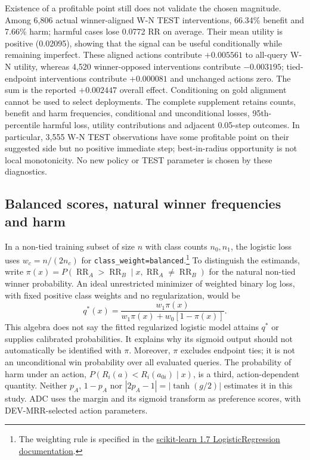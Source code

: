 \documentclass[11pt,a4paper]{article}
\newcommand{\RR}{\operatorname{RR}}
\begin{document}


Existence of a profitable point still does not validate the chosen magnitude. Among 6,806 actual winner-aligned W-N TEST interventions, 66.34\% benefit and 7.66\% harm; harmful cases lose 0.0772 RR on average. Their mean utility is positive (0.02095), showing that the signal can be useful conditionally while remaining imperfect. These aligned actions contribute $+0.005561$ to all-query W-N utility, whereas 4,520 winner-opposed interventions contribute $-0.003195$; tied-endpoint interventions contribute $+0.000081$ and unchanged actions zero. The sum is the reported $+0.002447$ overall effect. Conditioning on gold alignment cannot be used to select deployments. The complete supplement retains counts, benefit and harm frequencies, conditional and unconditional losses, 95th-percentile harmful loss, utility contributions and adjacent 0.05-step outcomes. In particular, 3,555 W-N TEST observations have some profitable point on their suggested side but no positive immediate step; best-in-radius opportunity is not local monotonicity. No new policy or TEST parameter is chosen by these diagnostics.

\subsection{Balanced scores, natural winner frequencies and harm}
In a non-tied training subset of size $n$ with class counts $n_0,n_1$, the logistic loss uses $w_c=n/(2n_c)$ for \texttt{class\_weight=balanced}.\footnote{The weighting rule is specified in the \href{https://scikit-learn.org/1.7/modules/generated/sklearn.linear_model.LogisticRegression.html}{scikit-learn 1.7 LogisticRegression documentation}.} To distinguish the estimands, write $\pi(x)=P(\RR_A>\RR_B\mid x,\RR_A\ne\RR_B)$ for the natural non-tied winner probability. An ideal unrestricted minimizer of weighted binary log loss, with fixed positive class weights and no regularization, would be
\begin{equation}
q^*(x)=\frac{w_1\pi(x)}{w_1\pi(x)+w_0[1-\pi(x)]}.
\label{eq:weighted-preference}
\end{equation}
This algebra does not say the fitted regularized logistic model attains $q^*$ or supplies calibrated probabilities. It explains why its sigmoid output should not automatically be identified with $\pi$. Moreover, $\pi$ excludes endpoint ties; it is not an unconditional win probability over all evaluated queries. The probability of harm under an action, $P(R_i(a)<R_i(a_{0i})\mid x)$, is a third, action-dependent quantity. Neither $p_A$, $1-p_A$ nor $|2p_A-1|=|\tanh(g/2)|$ estimates it in this study. ADC uses the margin and its sigmoid transform as preference scores, with DEV-MRR-selected action parameters.
\end{document}
